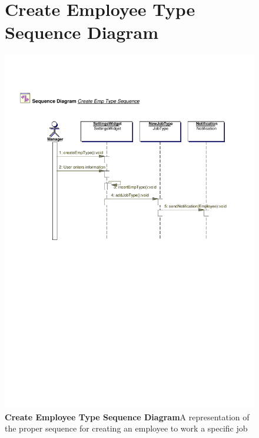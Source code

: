 \documentclass[letterpaper,12pt]{report}
\begin{document}
\begin{figure}[hbp]
 \section{Create Employee Type Sequence Diagram}
 \includegraphics[scale=0.65]{externals/SequenceDiagrams3.pdf}
 \caption{\small
\textbf{Create Employee Type Sequence Diagram}\newline A representation of the proper sequence for creating an employee to work a specific job}\label{fig:seqEmployeeType}
\end{figure}
\newpage
\end{document}
